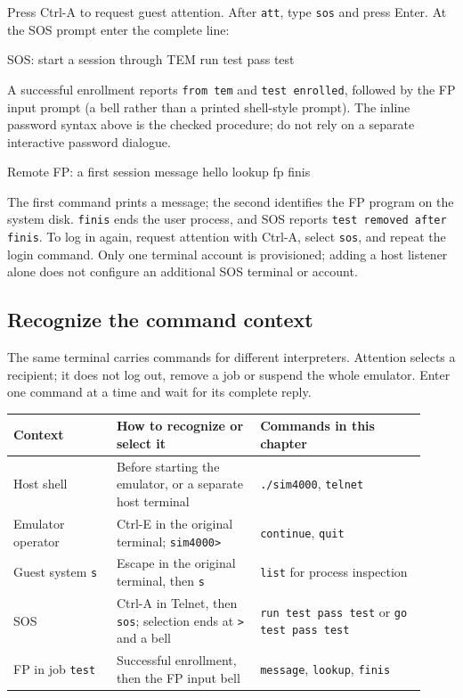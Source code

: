 Press Ctrl-A to request guest attention. After \texttt{att}, type
\texttt{sos} and press Enter. At the SOS prompt enter the complete line:

\begin{commandexample}{SOS: start a session through TEM}
run test pass test
\end{commandexample}

A successful enrollment reports \texttt{from tem} and
\texttt{test enrolled}, followed by the FP input prompt (a bell rather than
a printed shell-style prompt). The inline password syntax above is the
checked procedure; do not rely on a separate interactive password dialogue.

\begin{commandexample}{Remote FP: a first session}
message hello
lookup fp
finis
\end{commandexample}

The first command prints a message; the second identifies the FP program
on the system disk. \texttt{finis} ends the user process, and SOS reports
\texttt{test removed after finis}. To log in again, request attention with
Ctrl-A, select \texttt{sos}, and repeat the login command. Only one terminal
account is provisioned; adding a host listener alone does not configure an
additional SOS terminal or account.

\subsection{Recognize the command context}\label{mips-ts-command-contexts}

The same terminal carries commands for different interpreters. Attention
selects a recipient; it does not log out, remove a job or suspend the whole
emulator. Enter one command at a time and wait for its complete reply.

\begin{longtable}{@{}p{0.23\linewidth}p{0.32\linewidth}p{0.37\linewidth}@{}}
\toprule
Context & How to recognize or select it & Commands in this chapter \\
\midrule
\endhead
\bottomrule
\endfoot
Host shell & Before starting the emulator, or a separate host terminal &
\texttt{./sim4000}, \texttt{telnet} \\
Emulator operator & Ctrl-E in the original terminal; \texttt{sim4000>} &
\texttt{continue}, \texttt{quit} \\
Guest system \texttt{s} & Escape in the original terminal, then \texttt{s} &
\texttt{list} for process inspection \\
SOS & Ctrl-A in Telnet, then \texttt{sos}; selection ends at \texttt{>} and a bell &
\texttt{run test pass test} or \texttt{go test pass test} \\
FP in job \texttt{test} & Successful enrollment, then the FP input bell &
\texttt{message}, \texttt{lookup}, \texttt{finis} \\
\end{longtable}

